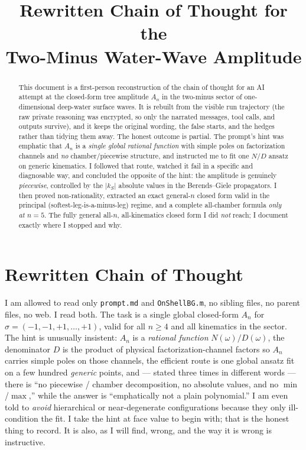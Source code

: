 \documentclass{article}
\title{Rewritten Chain of Thought for the\\
Two-Minus Water-Wave Amplitude}
\author{}
\date{}
\begin{document}
\maketitle

\begin{abstract}
This document is a first-person reconstruction of the chain of thought for an AI
attempt at the closed-form tree amplitude $A_n$ in the two-minus sector of
one-dimensional deep-water surface waves. It is rebuilt from the visible run
trajectory (the raw private reasoning was encrypted, so only the narrated
messages, tool calls, and outputs survive), and it keeps the original wording,
the false starts, and the hedges rather than tidying them away. The honest
outcome is partial. The prompt's hint was emphatic that $A_n$ is a \emph{single
global rational function} with simple poles on factorization channels and
\emph{no} chamber/piecewise structure, and instructed me to fit one $N/D$ ansatz
on generic kinematics. I followed that route, watched it fail in a specific and
diagnosable way, and concluded the opposite of the hint: the amplitude is
genuinely \emph{piecewise}, controlled by the $|k_S|$ absolute values in the
Berends--Giele propagators. I then proved non-rationality, extracted an exact
general-$n$ closed form valid in the principal (softest-leg-is-a-minus-leg)
regime, and a complete all-chamber formula \emph{only at $n=5$}. The fully
general all-$n$, all-kinematics closed form I did \emph{not} reach; I document
exactly where I stopped and why.
\end{abstract}

\section*{Rewritten Chain of Thought}

I am allowed to read only \texttt{prompt.md} and \texttt{OnShellBG.m}, no sibling
files, no parent files, no web. I read both. The task is a single global
closed-form $A_n$ for $\sigma=(-1,-1,+1,\dots,+1)$, valid for all $n\ge4$ and all
kinematics in the sector. The hint is unusually insistent: $A_n$ is a
\emph{rational function} $N(\omega)/D(\omega)$, the denominator $D$ is the product
of physical factorization-channel factors so $A_n$ carries simple poles on those
channels, the efficient route is one global ansatz fit on a few hundred
\emph{generic} points, and --- stated three times in different words --- there is
``no piecewise / chamber decomposition, no absolute values, and no $\min$/$\max$,''
while the answer is ``emphatically not a plain polynomial.'' I am even told to
\emph{avoid} hierarchical or near-degenerate configurations because they only
ill-condition the fit. I take the hint at face value to begin with; that is the
honest thing to record. It is also, as I will find, wrong, and the way it is
wrong is instructive.
\end{document}
